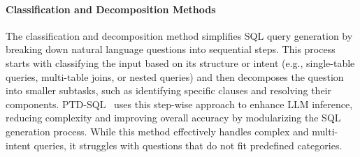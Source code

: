 \paragraph{Classification and Decomposition Methods}
The classification and decomposition method simplifies SQL query generation by breaking down natural language questions into sequential steps. This process starts with classifying the input based on its structure or intent (e.g., single-table queries, multi-table joins, or nested queries) and then decomposes the question into smaller subtasks, such as identifying specific clauses and resolving their components. PTD-SQL~\cite{ptd} uses this step-wise approach to enhance LLM inference, reducing complexity and improving overall accuracy by modularizing the SQL generation process. While this method effectively handles complex and multi-intent queries, it struggles with questions that do not fit predefined categories.

